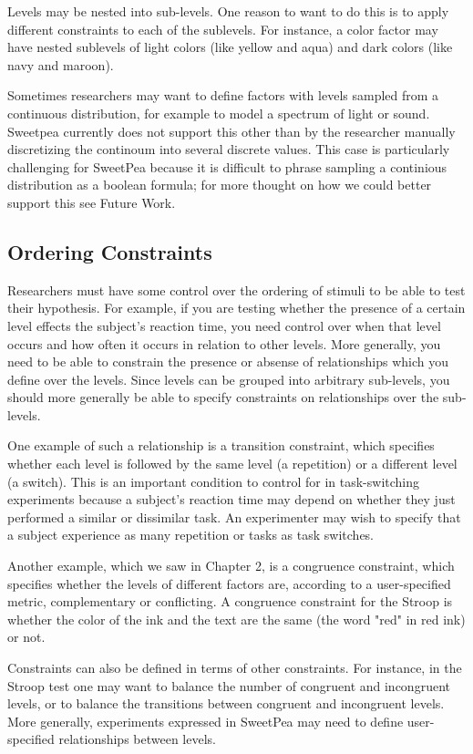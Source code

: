 Levels may be nested into sub-levels. One reason to want to do this is to apply different constraints to each of the sublevels. For instance, a color factor may have nested sublevels of light colors (like yellow and aqua) and dark colors (like navy and maroon).

Sometimes researchers may want to define factors with levels sampled from a continuous distribution, for example to model a spectrum of light or sound. Sweetpea currently does not support this other than by the researcher manually discretizing the continoum into several discrete values. This case is particularly challenging for SweetPea because it is difficult to phrase sampling a continious distribution as a boolean formula; for more thought on how we could better support this see Future Work.

\subsection{Ordering Constraints}

Researchers must have some control over the ordering of stimuli to be able to test their hypothesis. For example, if you are testing whether the presence of a certain level effects the subject's reaction time, you need control over when that level occurs and how often it occurs in relation to other levels. More generally, you need to be able to constrain the presence or absense of relationships which you define over the levels. Since levels can be grouped into arbitrary sub-levels, you should more generally be able to specify constraints on relationships over the sub-levels.

One example of such a relationship is a transition constraint, which specifies whether each level is followed by the same level (a repetition) or a different level (a switch). This is an important condition to control for in task-switching experiments because a subject's reaction time may depend on whether they just performed a similar or dissimilar task. An experimenter may wish to specify that a subject experience as many repetition or tasks as task switches.

Another example, which we saw in Chapter 2, is a congruence constraint, which specifies whether the levels of different factors are, according to a user-specified metric, complementary or conflicting. A congruence constraint for the Stroop is whether the color of the ink and the text are the same (the word "red" in red ink) or not.

Constraints can also be defined in terms of other constraints. For instance, in the Stroop test one may want to balance the number of congruent and incongruent levels, or to balance the transitions between congruent and incongruent levels. More generally, experiments expressed in SweetPea may need to define user-specified relationships between levels.

